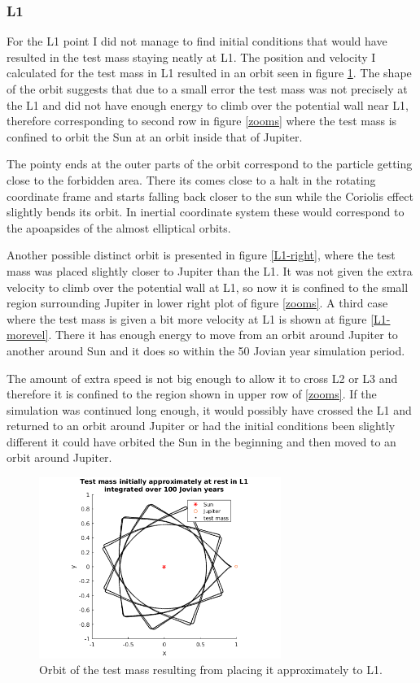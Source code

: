 \documentclass[12pt,a4paper,titlepage]{article}
\begin{document}
\subsubsection{L1}
For the L1 point I did not manage to find initial conditions that would have resulted in the test mass staying neatly at L1. The position and velocity I calculated for the test mass in L1 resulted in an orbit seen in figure \ref{L1-stable}. The shape of the orbit suggests that due to a small error the test mass was not precisely at the L1 and did not have enough energy to climb over the potential wall near L1, therefore corresponding to second row in figure \ref{zooms} where the test mass is confined to orbit the Sun at an orbit inside that of Jupiter.

The pointy ends at the outer parts of the orbit correspond to the particle getting close to the forbidden area. There its comes close to a halt in the rotating coordinate frame and starts falling back closer to the sun while the Coriolis effect slightly bends its orbit. In inertial coordinate system these would correspond to the apoapsides of the almost elliptical orbits.

Another possible distinct orbit is presented in figure \ref{L1-right}, where the test mass was placed slightly closer to Jupiter than the L1. It was not given the extra velocity to climb over the potential wall at L1, so now it is confined to the small region surrounding Jupiter in lower right plot of figure \ref{zooms}. A third case where the test mass is given a bit more velocity at L1 is shown at figure \ref{L1-morevel}. There it has enough energy to move from an orbit around Jupiter to another around Sun and it does so within the 50 Jovian year simulation period.

The amount of extra speed is not big enough to allow it to cross L2 or L3 and therefore it is confined to the region shown in upper row of \ref{zooms}. If the simulation was continued long enough, it would possibly have crossed the L1 and returned to an orbit around Jupiter or had the initial conditions been slightly different it could have orbited the Sun in the beginning and then moved to an orbit around Jupiter.

\begin{figure}
\centering
\includegraphics[width=0.7\textwidth]{../plots/L1-stationary.png}
\caption{Orbit of the test mass resulting from placing it approximately to L1.}
\label{L1-stable}
\end{figure}
\end{document}
